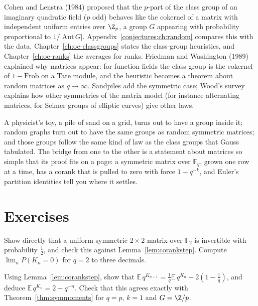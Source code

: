 \begin{remark}\label{rem:cohenlenstra}
Cohen and Lenstra (1984) proposed that the $p$-part of the class group of an imaginary quadratic field ($p$ odd) behaves like the cokernel of a matrix with independent uniform entries over $\Z_p$, a group $G$ appearing with probability proportional to $1/|\mathrm{Aut}\,G|$. Appendix~\ref{conjectures:ch:random} compares this with the data. Chapter~\ref{ch:oc-classgroups} states the class-group heuristics, and Chapter~\ref{ch:oc-ranks} the averages for ranks. Friedman and Washington (1989) explained why matrices appear: for function fields the class group is the cokernel of $1-\mathrm{Frob}$ on a Tate module, and the heuristic becomes a theorem about random matrices as $q\to\infty$. Sandpiles add the symmetric case; Wood's survey explains how other symmetries of the matrix model (for instance alternating matrices, for Selmer groups of elliptic curves) give other laws.
\end{remark}

\begin{beauty}
A physicist's toy, a pile of sand on a grid, turns out to have a group inside it; random graphs turn out to have the same groups as random symmetric matrices; and those groups follow the same kind of law as the class groups that Gauss tabulated. The bridge from one to the other is a statement about matrices so simple that its proof fits on a page: a symmetric matrix over $\mathbb F_q$, grown one row at a time, has a corank that is pulled to zero with force $1-q^{-k}$, and Euler's partition identities tell you where it settles.
\end{beauty}

\section{Exercises}

\begin{exercise}[$\star$]\label{ex:fullrank}
Show directly that a uniform symmetric $2\times2$ matrix over $\mathbb F_2$ is invertible with probability $\frac12$, and check this against Lemma~\ref{lem:corankstep}. Compute $\lim_nP(K_n=0)$ for $q=2$ to three decimals.
\end{exercise}

\begin{exercise}[$\star$]\label{ex:emoment}
Using Lemma~\ref{lem:corankstep}, show that $\mathbb E\,q^{K_{n+1}}=\frac1q\mathbb E\,q^{K_n}+2(1-\frac1q)$, and deduce $\mathbb E\,q^{K_n}=2-q^{-n}$. Check that this agrees exactly with Theorem~\ref{thm:symmoments} for $q=p$, $k=1$ and $G=\Z/p$.
\end{exercise}

